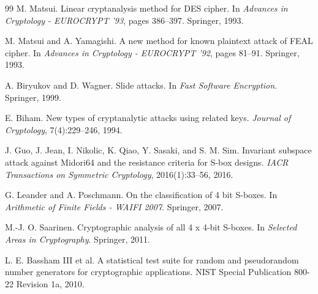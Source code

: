 \documentclass[11pt]{article}
\begin{document}
\begin{thebibliography}{99}
M. Matsui.
\newblock Linear cryptanalysis method for DES cipher.
\newblock In \emph{Advances in Cryptology - EUROCRYPT '93}, pages 386--397. Springer, 1993.

M. Matsui and A. Yamagishi.
\newblock A new method for known plaintext attack of FEAL cipher.
\newblock In \emph{Advances in Cryptology - EUROCRYPT '92}, pages 81--91. Springer, 1993.

A. Biryukov and D. Wagner.
\newblock Slide attacks.
\newblock In \emph{Fast Software Encryption}. Springer, 1999.

E. Biham.
\newblock New types of cryptanalytic attacks using related keys.
\newblock \emph{Journal of Cryptology}, 7(4):229--246, 1994.

J. Guo, J. Jean, I. Nikolic, K. Qiao, Y. Sasaki, and S. M. Sim.
\newblock Invariant subspace attack against Midori64 and the resistance criteria for S-box designs.
\newblock \emph{IACR Transactions on Symmetric Cryptology}, 2016(1):33--56, 2016.

G. Leander and A. Poschmann.
\newblock On the classification of 4 bit S-boxes.
\newblock In \emph{Arithmetic of Finite Fields - WAIFI 2007}. Springer, 2007.

M.-J. O. Saarinen.
\newblock Cryptographic analysis of all 4 x 4-bit S-boxes.
\newblock In \emph{Selected Areas in Cryptography}. Springer, 2011.

L. E. Bassham III et al.
\newblock A statistical test suite for random and pseudorandom number generators for cryptographic applications.
\newblock NIST Special Publication 800-22 Revision 1a, 2010.

\end{thebibliography}
\end{document}
